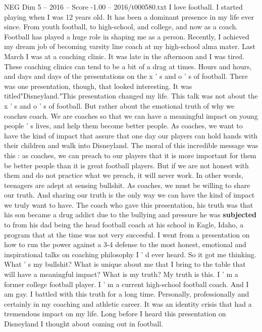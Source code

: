 \begin{textsample}{NEG Dim 5 – 2016 – Score -1.00 – 2016/t000580.txt}  \label{ex:f5_neg_026}
I love football.
I started playing when I was 12 years old.
It has been a dominant presence in my life ever since.
From youth football, to high-school, and college, and now as a coach.
Football has played a huge role in shaping me as a person.
Recently, I achieved my dream job of becoming varsity line coach at my high-school alma mater.
Last March I was at a coaching clinic.
It was late in the afternoon and I was tired.
These coaching clinics can tend to be a bit of a drag at times.
Hours and hours, and days and days of the presentations on the x ' s and o ' s of football.
There was one presentation, though, that looked interesting.
It was titled"Disneyland."This presentation changed my life.
This talk was not about the x ' s and o ' s of football.
But rather about the emotional truth of why we coaches coach.
We are coaches so that we can have a meaningful impact on young people ' s lives, and help them become better people.
As coaches, we want to have the kind of impact that assure that one day our players can hold hands with their children and walk into Disneyland.
The moral of this incredible message was this : as coaches, we can preach to our players that it is more important for them be better people than it is great football players.
But if we are not honest with them and do not practice what we preach, it will never work.
In other words, teenagers are adept at sensing bullshit.
As coaches, we must be willing to share our truth.
And sharing our truth is the only way we can have the kind of impact we truly want to have.
The coach who gave this presentation, his truth was that his son became a drug addict due to the bullying and pressure he was \textbf{subjected} to from his dad being the head football coach at his school in Eagle, Idaho, a program that at the time was not very succesful.
I went from a presentation on how to run the power against a 3-4 defense to the most honest, emotional and inspirational talks on coaching philosophy I ' d ever heard.
So it got me thinking.
What ' s my bullshit?
What is unique about me that I bring to the table that will have a meaningful impact?
What is my truth?
My truth is this.
I ' m a former college football player.
I ' m a current high-school football coach.
And I am gay.
I battled with this truth for a long time.
Personally, professionally and certainly in my coaching and athletic career.
It was an identity crisis that had a tremendous impact on my life.
Long before I heard this presentation on Disneyland I thought about coming out in football.

\end{textsample}
